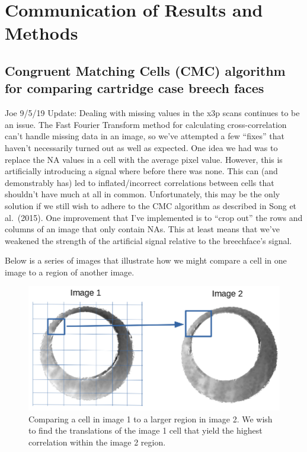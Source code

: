 \documentclass[]{book}
\begin{document}
\hypertarget{communication-of-results-and-methods}{%
\section{Communication of Results and Methods}\label{communication-of-results-and-methods}}

\hypertarget{congruent-matching-cells-cmc-algorithm-for-comparing-cartridge-case-breech-faces}{%
\subsection{Congruent Matching Cells (CMC) algorithm for comparing cartridge case breech faces}\label{congruent-matching-cells-cmc-algorithm-for-comparing-cartridge-case-breech-faces}}

Joe 9/5/19 Update: Dealing with missing values in the x3p scans continues to be an issue. The Fast Fourier Transform method for calculating cross-correlation can't handle missing data in an image, so we've attempted a few ``fixes'' that haven't necessarily turned out as well as expected. One idea we had was to replace the NA values in a cell with the average pixel value. However, this is artificially introducing a signal where before there was none. This can (and demonstrably has) led to inflated/incorrect correlations between cells that shouldn't have much at all in common. Unfortunately, this may be the only solution if we still wish to adhere to the CMC algorithm as described in Song et al.~(2015). One improvement that I've implemented is to ``crop out'' the rows and columns of an image that only contain NAs. This at least means that we've weakened the strength of the artificial signal relative to the breechface's signal.

Below is a series of images that illustrate how we might compare a cell in one image to a region of another image.

\begin{figure}

{\centering \includegraphics[width=0.5\linewidth]{images/joeZ/im1_im2_cellComparison} 

}

\caption{Comparing a cell in image 1 to a larger region in image 2. We wish to find the translations of the image 1 cell that yield the highest correlation within the image 2 region.}\label{fig:unnamed-chunk-6}
\end{figure}
\end{document}
